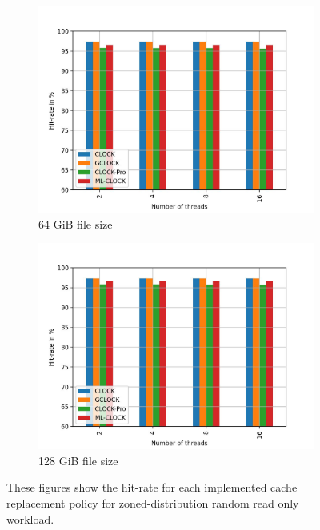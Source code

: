 \documentclass[
	12pt,
	a4paper,
	abstract,
	bibliography=totoc,
	chapterprefix,
	headings=openright,
	numbers=endperiod,
	parskip=half,
	twoside,
]{scrreprt}
\begin{document}
\begin{figure}[H]
\begin{subfigure}{0.4\textwidth}
	\end{subfigure}
	\hfill
	\begin{subfigure}{0.4\textwidth}
		\includegraphics[width=\textwidth]{multi_64_gb_randread_zoned.jpg}		
		\caption{64 GiB file size}
		\label{fig:rw_90to10  zoned}
	\end{subfigure}
	\hfill
	\begin{subfigure}{0.4\textwidth}
		\includegraphics[width=\textwidth]{multi_128_gb_randread_zoned.jpg}		
		\caption{128 GiB file size}
		\label{fig:rw_90to10  uniform}
	\end{subfigure}
	\caption{These figures show the hit-rate for each implemented cache replacement policy for zoned-distribution random read only workload.}
\end{figure}
\end{document}

